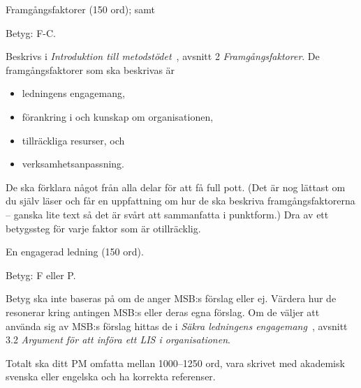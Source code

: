 \documentclass[a4paper]{llncs}
\begin{document}
  \begin{exercise}
  Framgångsfaktorer (150 ord); samt
  \begin{solution}
    Betyg: F-C.

    Beskrivs i \emph{Introduktion till metodstödet}~\cite{MSB2011itm}, avsnitt 
    2 \emph{Framgångsfaktorer}.
    De framgångsfaktorer som ska beskrivas är
    \begin{itemize}
      \item ledningens engagemang,
      \item förankring i och kunskap om organisationen,
      \item tillräckliga resurser, och
      \item verksamhetsanpassning.
    \end{itemize}

    De ska förklara något från alla delar för att få full pott.
    (Det är nog lättast om du själv läser och får en uppfattning om hur de ska 
    beskriva framgångsfaktorerna -- ganska lite text så det är svårt att 
    sammanfatta i punktform.)
    Dra av ett betygssteg för varje faktor som är otillräcklig.
  \end{solution}
\end{exercise}

\begin{exercise}
  En engagerad ledning (150 ord).
  \begin{solution}
    Betyg: F eller P.

    Betyg ska inte baseras på om de anger MSB:s förslag eller ej.
    Värdera hur de resonerar kring antingen MSB:s eller deras egna förslag.
    Om de väljer att använda sig av MSB:s förslag hittas de i \emph{Säkra 
    ledningens engagemang}~\cite{MSB2011sle}, avsnitt 3.2 \emph{Argument för 
    att införa ett LIS i organisationen}.
  \end{solution}
\end{exercise}

Totalt ska ditt PM omfatta mellan 1000--1250 ord, vara skrivet med akademisk 
svenska eller engelska och ha korrekta referenser.


\printbibliography{}
\end{document}

